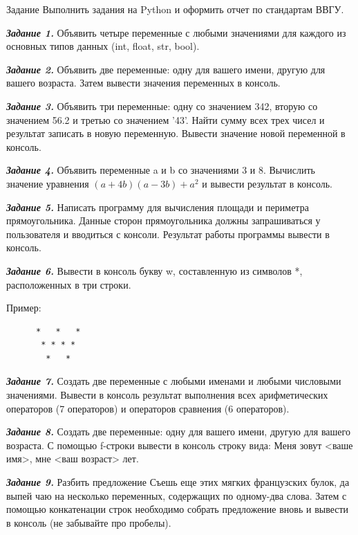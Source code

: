 \documentclass[]{vvsu}
\begin{document}
\begin{addition}{Задание}
  Выполнить задания на Python и оформить отчет по стандартам ВВГУ.

  \textit{\textbf{Задание 1.}}  
  Объявить четыре переменные с любыми значениями для каждого из основных типов данных (int, float, str, bool).

  \textit{\textbf{Задание 2.}}  
  Объявить две переменные: одну для вашего имени, другую для вашего возраста. Затем вывести значения переменных в консоль.

  \textit{\textbf{Задание 3.}}  
  Объявить три переменные: одну со значением 342, вторую со значением 56.2 и третью со значением '43'.  
  Найти сумму всех трех чисел и результат записать в новую переменную. Вывести значение новой переменной в консоль.

  \textit{\textbf{Задание 4.}}  
  Объявить переменные a и b со значениями 3 и 8.  
  Вычислить значение уравнения $(a + 4b)(a - 3b) + a ^ 2$ и вывести результат в консоль.

  \textit{\textbf{Задание 5.}}  
  Написать программу для вычисления площади и периметра прямоугольника.  
  Данные сторон прямоугольника должны запрашиваться у пользователя и вводиться с консоли.  
  Результат работы программы вывести в консоль.

  \textit{\textbf{Задание 6.}}  
  Вывести в консоль букву w, составленную из символов *, расположенных в три строки.

  Пример:
  \begin{verbatim}
      *   *   *
       * * * *
        *   *\end{verbatim}

  \textit{\textbf{Задание 7.}}  
  Создать две переменные с любыми именами и любыми числовыми значениями.  
  Вывести в консоль результат выполнения всех арифметических операторов (7 операторов) и операторов сравнения (6 операторов).

  \textit{\textbf{Задание 8.}}  
  Создать две переменные: одну для вашего имени, другую для вашего возраста.  
  С помощью f-строки вывести в консоль строку вида:  
  Меня зовут <ваше имя>, мне <ваш возраст> лет.

  \textit{\textbf{Задание 9.}}  
  Разбить предложение Съешь еще этих мягких французских булок, да выпей чаю 
  на несколько переменных, содержащих по одному-два слова.  
  Затем с помощью конкатенации строк необходимо собрать предложение вновь и вывести в консоль (не забывайте про пробелы).


\end{addition}
\end{document}

